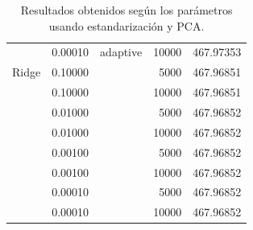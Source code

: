 \documentclass[a4paper, 20pt]{article}
\begin{document}
\begin{table}[h!]
\begin{tabular}{lrlrr}
             & 0.00010   & adaptive & 10000       & 467.97353 \\
Ridge        & 0.10000   &          & 5000        & 467.96851 \\
             & 0.10000   &          & 10000       & 467.96851 \\
             & 0.01000   &          & 5000        & 467.96852 \\
             & 0.01000   &          & 10000       & 467.96852 \\
             & 0.00100   &          & 5000        & 467.96852 \\
             & 0.00100   &          & 10000       & 467.96852 \\
             & 0.00010   &          & 5000        & 467.96852 \\
             & 0.00010   &          & 10000       & 467.96852
\end{tabular}
\caption{Resultados obtenidos según los parámetros usando estandarización y PCA.}
\end{table}
\end{document}
